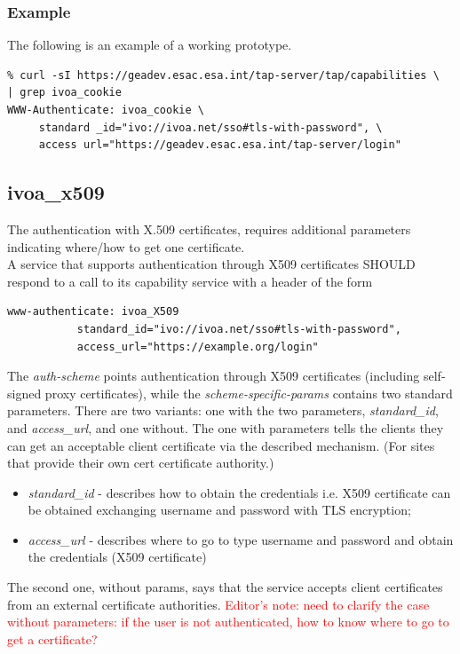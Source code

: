 \documentclass[11pt,a4paper]{ivoa}
\begin{document}
\subsubsection{Example}
The following is an example of a working prototype.
\begin{verbatim}
% curl -sI https://geadev.esac.esa.int/tap-server/tap/capabilities \
| grep ivoa_cookie
WWW-Authenticate: ivoa_cookie \
     standard _id="ivo://ivoa.net/sso#tls-with-password", \
     access url="https://geadev.esac.esa.int/tap-server/login"
\end{verbatim}


\subsection{ivoa\_x509}
The authentication with X.509 certificates, requires additional parameters 
indicating where/how to get one certificate. \\
A service that supports authentication through X509 certificates SHOULD
respond to a call to its capability service with a header
of the form
\begin{verbatim}
www-authenticate: ivoa_X509 
           standard_id="ivo://ivoa.net/sso#tls-with-password", 
           access_url="https://example.org/login"
\end{verbatim}

The \emph{auth-scheme} points authentication 
through X509 certificates (including self-signed
proxy certificates), while the \emph{scheme-specific-params} contains  
two standard parameters. There are two variants: one with the two
parameters, \emph{standard\_id}, and \emph{access\_url}, and one without. The
one with parameters tells the clients they can get an acceptable client
certificate via the described mechanism. (For sites that provide their own cert
certificate authority.) 
\begin{itemize}
\item{\emph{standard\_id}} - describes how to obtain the 
credentials i.e. X509 certificate can be obtained exchanging
username and password with TLS encryption;
\item{\emph{access\_url}} - describes where to go to type
username and password and obtain the credentials (X509 certificate)
\end{itemize}
The second one, without params, says that the
service accepts client certificates from an external certificate
authorities.
\textcolor{red}{Editor's note: need to clarify the case without 
parameters: if the user is not authenticated, how to know where 
to go to get a certificate?}
\end{document}
